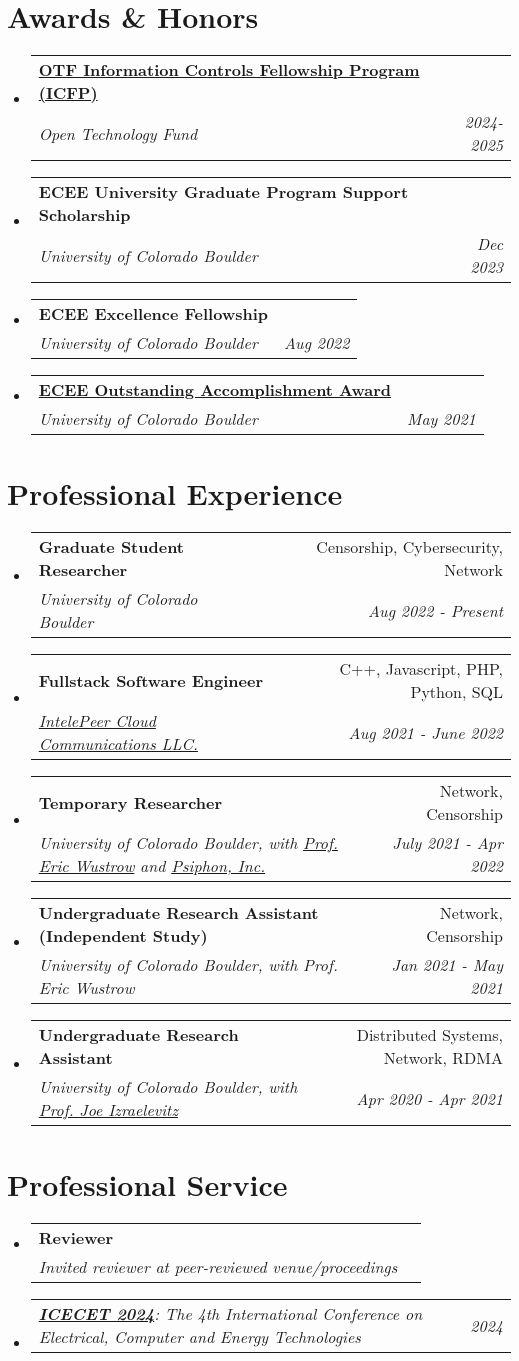 \documentclass[letterpaper,11pt]{article}
\makeatletter
\newcommand{\resumeSubheading}[4]{
  \vspace{-2pt}\item
    \begin{tabular*}{0.97\textwidth}[t]{l@{\extracolsep{\fill}}r}
      \textbf{#1} & #2 \\
      \textit{\small#3} & \textit{\small #4} \\
    \end{tabular*}\vspace{-7pt}
}
\newcommand{\resumeSubSubheading}[2]{
    \item
    \begin{tabular*}{0.97\textwidth}{l@{\extracolsep{\fill}}r}
      \textit{\small#1} & \textit{\small #2} \\
    \end{tabular*}\vspace{-7pt}
}
\newcommand{\resumeSubHeadingListStart}{\begin{itemize}[leftmargin=0.15in, label={}]}
\newcommand{\resumeSubHeadingListEnd}{\end{itemize}}
\makeatother
\begin{document}
\section{Awards \& Honors}
\resumeSubHeadingListStart
\resumeSubheading
{\href{https://www.opentech.fund/fellowships/icfp/}{OTF Information Controls Fellowship Program (ICFP)}}{}
{Open Technology Fund}{2024-2025}
\resumeSubheading
{ECEE University Graduate Program Support Scholarship}{}
{University of Colorado Boulder}{Dec 2023}
\resumeSubheading
{ECEE Excellence Fellowship}{}
{University of Colorado Boulder}{Aug 2022}
\resumeSubheading
{\href{https://www.colorado.edu/ecee/celebrating-class-2021}{ECEE Outstanding Accomplishment Award}}{}
{University of Colorado Boulder}{May 2021}
\resumeSubHeadingListEnd
\vspace{1pt}

\section{Professional Experience}
\resumeSubHeadingListStart
\resumeSubheading
{Graduate Student Researcher}{Censorship, Cybersecurity, Network}
{University of Colorado Boulder}{Aug 2022 - Present}
\resumeSubheading
{Fullstack Software Engineer}{C++, Javascript, PHP, Python, SQL}
{\href{https://intelepeer.ai/}{IntelePeer Cloud Communications LLC.}}{Aug 2021 - June 2022}
\resumeSubheading
{Temporary Researcher}{Network, Censorship}
{University of Colorado Boulder, with 
  \href{https://www.colorado.edu/ecee/eric-wustrow}{Prof. Eric Wustrow} 
and 
  \href{https://psiphon.ca/}{Psiphon, Inc.}
}{July 2021 - Apr 2022}
\resumeSubheading
{Undergraduate Research Assistant (Independent Study)}{Network, Censorship}
{University of Colorado Boulder, with Prof. Eric Wustrow}{Jan 2021 - May 2021}
\resumeSubheading
{Undergraduate Research Assistant}{Distributed Systems, Network, RDMA}
{University of Colorado Boulder, with 
  \href{https://www.colorado.edu/ecee/joseph-joe-izraelevitz}{Prof. Joe Izraelevitz}
}{Apr 2020 - Apr 2021}
\resumeSubHeadingListEnd
\vspace{1pt}

\section{Professional Service}
\resumeSubHeadingListStart
\resumeSubheading
{Reviewer}{}
{Invited reviewer at peer-reviewed venue/proceedings}{}
\resumeSubSubheading
{
  \em\href{https://www.icecet.com/}{\textbf{ICECET 2024}}: The 4th International Conference on Electrical, Computer and Energy Technologies
}{2024}
\resumeSubHeadingListEnd
\end{document}
